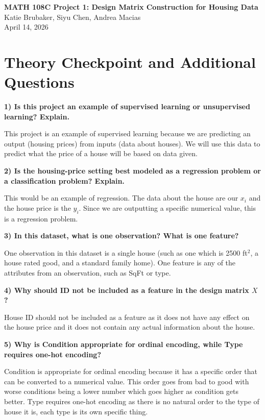 \documentclass[11pt]{article}
\begin{document}
\begin{center}
    {\LARGE \textbf{MATH 108C Project 1: Design Matrix Construction for Housing Data}}\\[0.5em]
    {\large Katie Brubaker, Siyu Chen, Andrea Macias}\\[0.5em]
    {\large April 14, 2026}
\end{center}

\vspace{1em}

\section{Theory Checkpoint and Additional Questions}

\textbf{1) Is this project an example of supervised learning or unsupervised learning? Explain.}

This project is an example of supervised learning because we are predicting an output (housing prices) from inputs (data about houses). We will use this data to predict what the price of a house will be based on data given.

\textbf{2) Is the housing-price setting best modeled as a regression problem or a classification problem? Explain.}

This would be an example of regression. The data about the house are our $x_i$ and the house price is the $y_i$. Since we are outputting a specific numerical value, this is a regression problem.

\textbf{3) In this dataset, what is one observation? What is one feature?}

One observation in this dataset is a single house (such as one which is 2500 ft$^2$, a house rated good, and a standard family home). One feature is any of the attributes from an observation, such as SqFt or type.

\textbf{4) Why should ID not be included as a feature in the design matrix $X$?}

House ID should not be included as a feature as it does not have any effect on the house price and it does not contain any actual information about the house.

\textbf{5) Why is Condition appropriate for ordinal encoding, while Type requires one-hot encoding?}

Condition is appropriate for ordinal encoding because it has a specific order that can be converted to a numerical value. This order goes from bad to good with worse conditions being a lower number which goes higher as condition gets better. Type requires one-hot encoding as there is no natural order to the type of house it is, each type is its own specific thing.
\end{document}
